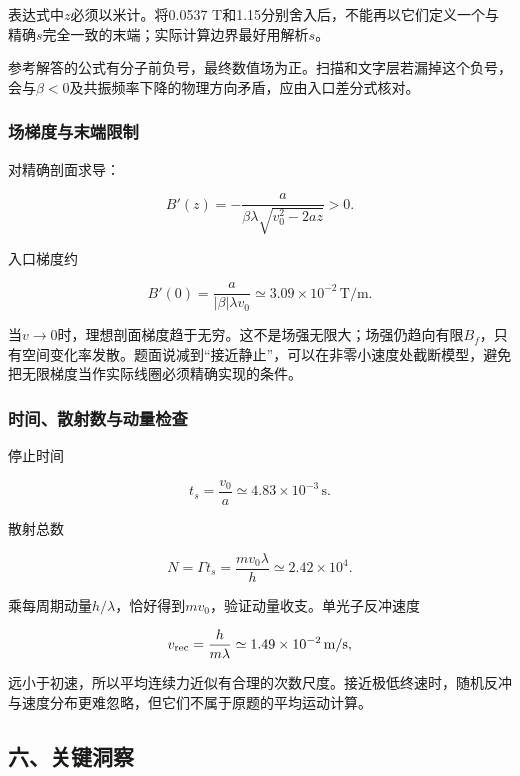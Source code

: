 \documentclass[12pt,a4paper,fontset=fandol]{ctexart}
\begin{document}
表达式中\(z\)必须以米计。将0.0537
T和1.15分别舍入后，不能再以它们定义一个与精确\(s\)完全一致的末端；实际计算边界最好用解析\(s\)。

参考解答的公式有分子前负号，最终数值场为正。扫描和文字层若漏掉这个负号，会与\(\beta<0\)及共振频率下降的物理方向矛盾，应由入口差分式核对。

\subsubsection{场梯度与末端限制}\label{ux573aux68afux5ea6ux4e0eux672bux7aefux9650ux5236}

对精确剖面求导：

\[
B'(z)=-\frac{a}{\beta\lambda\sqrt{v_0^2-2az}}>0.
\]

入口梯度约

\[
B'(0)=\frac{a}{|\beta|\lambda v_0}
\simeq3.09\times10^{-2}\,\mathrm{T/m}.
\]

当\(v\to0\)时，理想剖面梯度趋于无穷。这不是场强无限大；场强仍趋向有限\(B_f\)，只有空间变化率发散。题面说减到``接近静止''，可以在非零小速度处截断模型，避免把无限梯度当作实际线圈必须精确实现的条件。

\par\noindent\begin{minipage}{\linewidth}
\subsubsection{时间、散射数与动量检查}\label{ux65f6ux95f4ux6563ux5c04ux6570ux4e0eux52a8ux91cfux68c0ux67e5}

停止时间

\[
t_s=\frac{v_0}{a}\simeq4.83\times10^{-3}\,\mathrm s.
\]

散射总数

\[
N=\Gamma t_s=\frac{m v_0\lambda}{h}
\simeq2.42\times10^4.
\]

乘每周期动量\(h/\lambda\)，恰好得到\(m v_0\)，验证动量收支。单光子反冲速度

\[
v_{\rm rec}=\frac{h}{m\lambda}
\simeq1.49\times10^{-2}\,\mathrm{m/s},
\]

远小于初速，所以平均连续力近似有合理的次数尺度。接近极低终速时，随机反冲与速度分布更难忽略，但它们不属于原题的平均运动计算。

\end{minipage}\par
\subsection{六、关键洞察}\label{ux516dux5173ux952eux6d1eux5bdf-4}
\end{document}
